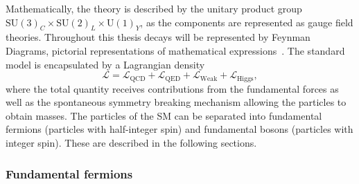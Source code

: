 Mathematically, the theory is described by the unitary product group $\text{SU}(3)_{C}\times\text{SU}(2)_{L}\times\text{U}(1)_{Y}$, as the components are represented as gauge field theories. Throughout this thesis decays will be represented by Feynman Diagrams, pictorial representations of mathematical expressions~\cite{PhysRev.76.749}.  
The standard model is encapsulated by a Lagrangian density
\begin{equation}
\mathcal{L} = \mathcal{L}_{\text{QCD}}+\mathcal{L}_{\text{QED}}+\mathcal{L}_{\text{Weak}}+\mathcal{L}_{\text{Higgs}},
\end{equation}
where the total quantity receives contributions from the fundamental forces as well as the spontaneous symmetry breaking mechanism allowing the particles to obtain masses. 
The particles of the SM can be separated into fundamental fermions (particles with half-integer spin) and fundamental bosons (particles with integer spin). These are described in the following sections.  


\subsubsection{Fundamental fermions}

